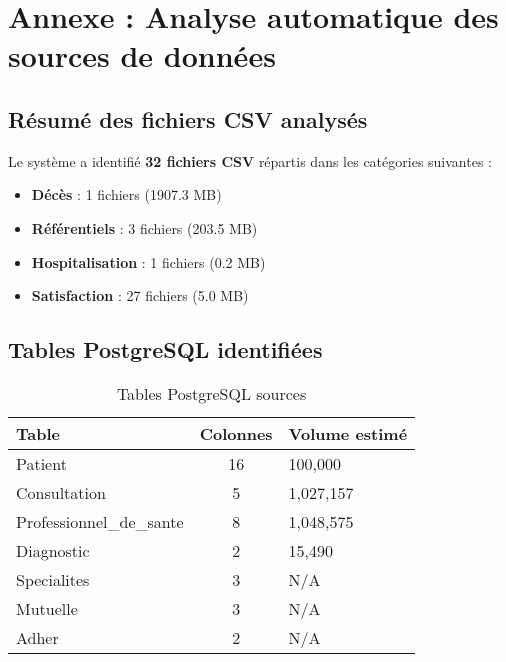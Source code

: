 

\section{Annexe : Analyse automatique des sources de données}

\subsection{Résumé des fichiers CSV analysés}

Le système a identifié \textbf{32 fichiers CSV} répartis dans les catégories suivantes :

\begin{itemize}[leftmargin=*]
    \item \textbf{Décès} : 1 fichiers (1907.3 MB)
    \item \textbf{Référentiels} : 3 fichiers (203.5 MB)
    \item \textbf{Hospitalisation} : 1 fichiers (0.2 MB)
    \item \textbf{Satisfaction} : 27 fichiers (5.0 MB)
\end{itemize}

\subsection{Tables PostgreSQL identifiées}

\begin{table}[H]
\centering
\caption{Tables PostgreSQL sources}
\begin{tabularx}{\textwidth}{|l|c|X|}
\hline
\textbf{Table} & \textbf{Colonnes} & \textbf{Volume estimé} \\
\hline
Patient & 16 & 100,000 \\
\hline
Consultation & 5 & 1,027,157 \\
\hline
Professionnel_de_sante & 8 & 1,048,575 \\
\hline
Diagnostic & 2 & 15,490 \\
\hline
Specialites & 3 & N/A \\
\hline
Mutuelle & 3 & N/A \\
\hline
Adher & 2 & N/A \\
\hline
\end{tabularx}
\end{table}

